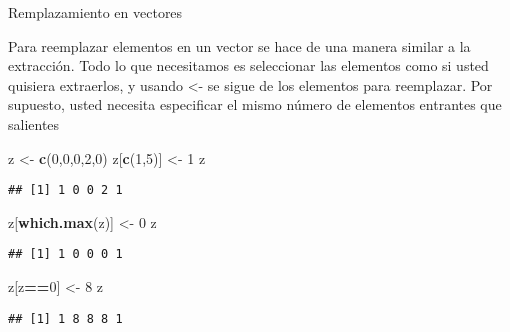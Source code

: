 \documentclass[ignorenonframetext,]{beamer}
\newenvironment{Shaded}{\begin{snugshade}}{\end{snugshade}}
\newcommand{\KeywordTok}[1]{\textcolor[rgb]{0.13,0.29,0.53}{\textbf{#1}}}
\newcommand{\DecValTok}[1]{\textcolor[rgb]{0.00,0.00,0.81}{#1}}
\newcommand{\StringTok}[1]{\textcolor[rgb]{0.31,0.60,0.02}{#1}}
\newcommand{\OperatorTok}[1]{\textcolor[rgb]{0.81,0.36,0.00}{\textbf{#1}}}
\newcommand{\NormalTok}[1]{#1}
\begin{document}
\begin{frame}[fragile]{Remplazamiento en vectores}

Para reemplazar elementos en un vector se hace de una manera similar a
la extracción. Todo lo que necesitamos es seleccionar las elementos como
si usted quisiera extraerlos, y usando \textless{}- se sigue de los
elementos para reemplazar. Por supuesto, usted necesita especificar el
mismo número de elementos entrantes que salientes

\begin{Shaded}
\begin{Highlighting}[]
\NormalTok{z <-}\StringTok{ }\KeywordTok{c}\NormalTok{(}\DecValTok{0}\NormalTok{,}\DecValTok{0}\NormalTok{,}\DecValTok{0}\NormalTok{,}\DecValTok{2}\NormalTok{,}\DecValTok{0}\NormalTok{)}
\NormalTok{z[}\KeywordTok{c}\NormalTok{(}\DecValTok{1}\NormalTok{,}\DecValTok{5}\NormalTok{)] <-}\StringTok{ }\DecValTok{1}
\NormalTok{z}
\end{Highlighting}
\end{Shaded}
\pause
\begin{verbatim}
## [1] 1 0 0 2 1
\end{verbatim}

\begin{Shaded}
\begin{Highlighting}[]
\NormalTok{z[}\KeywordTok{which.max}\NormalTok{(z)] <-}\StringTok{ }\DecValTok{0}
\NormalTok{z}
\end{Highlighting}
\end{Shaded}
\pause
\begin{verbatim}
## [1] 1 0 0 0 1
\end{verbatim}

\begin{Shaded}
\begin{Highlighting}[]
\NormalTok{z[z}\OperatorTok{==}\DecValTok{0}\NormalTok{] <-}\StringTok{ }\DecValTok{8}
\NormalTok{z}
\end{Highlighting}
\end{Shaded}
\pause
\begin{verbatim}
## [1] 1 8 8 8 1
\end{verbatim}

\end{frame}
\end{document}
